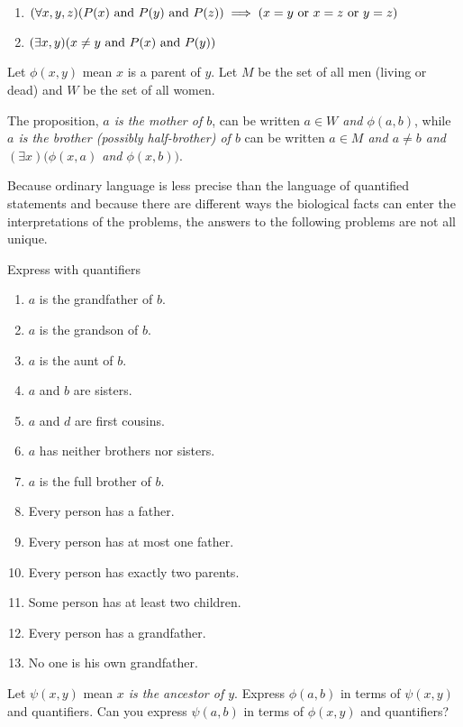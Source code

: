 \begin{solution}
\begin{enumerate}[label=(\alph*)]
    \item $(\forall x,y,z)\prn{P(x)\land P(y)\land P(z)}\implies (x=y\lor x=z\lor y=z)$
    \item $(\exists x,y)\prn{x\neq y \land P(x)\land P(y)}$
\end{enumerate}
\end{solution}

\begin{exercise}
Let $\phi(x, y)$ mean $x$ is a parent of $y$. Let $M$ be the set of all men (living or dead)
and $W$ be the set of all women.

The proposition, \textit{$a$ is the mother of $b$}, can be written \textit{$a\in W$ and $\phi(a, b)$}, while \textit{$a$ is the
brother (possibly half-brother) of $b$} can be written \textit{$a\in M$ and $a\neq b$ and $(\exists x) (\phi(x, a)$ and
$\phi(x, b))$}.

Because ordinary language is less precise than the language of quantified statements
and because there are different ways the biological facts can enter the interpretations of
the problems, the answers to the following problems are not all unique.

Express with quantifiers
\begin{enumerate}[label=(\alph*)]
    \item $a$ is the grandfather of $b$.
    \item $a$ is the grandson of $b$.
    \item $a$ is the aunt of $b$. 
    \item $a$ and $b$ are sisters.
    \item $a$ and $d$ are first cousins. 
    \item $a$ has neither brothers nor sisters.
    \item $a$ is the full brother of $b$.
    \item Every person has a father.
    \item Every person has at most one father.
    \item Every person has exactly two parents.
    \item Some person has at least two children.
    \item Every person has a grandfather.
    \item No one is his own grandfather.
\end{enumerate}

Let $\psi(x, y)$ mean \textit{$x$ is the ancestor of $y$}. Express $\phi(a,b)$ in terms of $\psi(x,y)$ and
quantifiers. Can you express $\psi(a, b)$ in terms of $\phi(x,y)$ and quantifiers?
\end{exercise}

